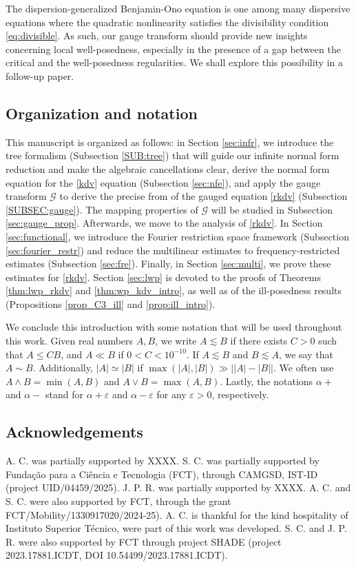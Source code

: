 \documentclass[%
11pt,  reqno]{amsart}
\newcommand{\5}{\textup{V}}
\newcommand{\les}{\lesssim}
\newcommand{\eps}{\varepsilon}
\theoremstyle{remark}
\newcommand{\al}{\alpha}
\newcommand{\Gc}{\mathcal{G}}
\numberwithin{equation}{section}
\numberwithin{theorem}{section}
\begin{document}
\bigskip

The dispersion-generalized Benjamin-Ono equation is one among many dispersive equations where the quadratic nonlinearity satisfies the divisibility condition \eqref{eq:divisible}. As such, our gauge transform should provide new insights concerning local well-posedness, especially in the presence of a gap between the critical and the well-posedness regularities. We shall explore this possibility in a follow-up paper.

\subsection{Organization and notation} This manuscript is organized as follows: in Section \ref{sec:infr}, we introduce the tree formalism (Subsection \ref{SUB:tree}) that will guide our infinite normal form reduction and make the algebraic cancellations clear, derive the normal form equation for the \eqref{kdv} equation (Subsection \ref{sec:nfe}), and apply the gauge transform $\Gc$ to derive the precise from of the gauged equation \ref{rkdv} (Subsection \ref{SUBSEC:gauge}). The mapping properties of $\Gc$ will be studied in Subsection \ref{sec:gauge_prop}. Afterwards, we move to the analysis of \eqref{rkdv}. In Section \ref{sec:functional}, we introduce the Fourier restriction space framework (Subsection \ref{sec:fourier_restr}) and reduce the multilinear estimates to frequency-restricted estimates (Subsection \ref{sec:fre}). Finally, in Section \ref{sec:multi}, we prove these estimates for \eqref{rkdv}. Section \ref{sec:lwp} is devoted to the proofs of Theorems \ref{thm:lwp_rkdv} and \ref{thm:wp_kdv_intro}, as well as of the ill-posedness results (Propositions \ref{prop_C3_ill} and \ref{prop:ill_intro}).

\bigskip

We conclude this introduction with some notation that will be used throughout this work. Given real numbers $A,B$, we write $A \les B$ if there exists $C>0$ such that $A \le CB$, and $A \ll B$ if $0<C< 10^{-10}$. If $A\les B$ and $B\les A$, we say that $A\sim B$. Additionally, $|A| \simeq |B|$ if $\max(|A|,|B|) \gg \big| |A| - |B| \big|$. 
We often use $A \land B = \min(A,B)$ and $A \lor B = \max(A,B)$. 
Lastly, 
the notations $\al +$ and $\al-$ stand for $\al+\eps$ and $\al-\eps$ for any $\eps>0$, respectively. 

\subsection{Acknowledgements} A. C. was partially supported by XXXX. S. C. was partially supported by Funda\c{c}\~ao para a Ci\^encia e Tecnologia (FCT), through CAMGSD, IST-ID (project UID/04459/2025). J. P. R.  was partially supported by XXXX. A. C. and S. C. were also supported by FCT, through the grant FCT/Mobility/1330917020/2024-25). A. C. is thankful for the kind hospitality of Instituto Superior Técnico, were part of this work was developed. S. C. and J. P. R. were also supported by FCT through project SHADE (project 2023.17881.ICDT, DOI  10.54499/2023.17881.ICDT).
\end{document}
